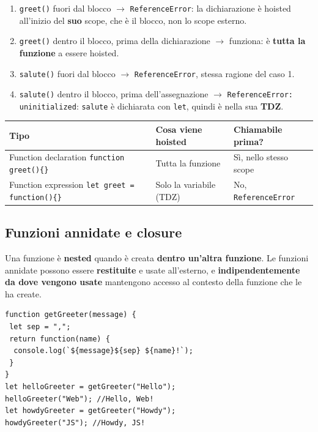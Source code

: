 \documentclass[10pt,a4paper]{article}
\begin{document}
\begin{enumerate}
  \item \texttt{greet()} fuori dal blocco $\rightarrow$ \texttt{ReferenceError}: la dichiarazione è hoisted all'inizio del \textbf{suo} scope, che è il blocco, non lo scope esterno.
  \item \texttt{greet()} dentro il blocco, prima della dichiarazione $\rightarrow$ funziona: è \textbf{tutta la funzione} a essere hoisted.
  \item \texttt{salute()} fuori dal blocco $\rightarrow$ \texttt{ReferenceError}, stessa ragione del caso 1.
  \item \texttt{salute()} dentro il blocco, prima dell'assegnazione $\rightarrow$ \texttt{ReferenceError: uninitialized}: \texttt{salute} è dichiarata con \texttt{let}, quindi è nella sua \textbf{TDZ}.
\end{enumerate}

\begin{center}
\small
\begin{tabularx}{\textwidth}{@{}lXX@{}}
\toprule
\textbf{Tipo} & \textbf{Cosa viene hoisted} & \textbf{Chiamabile prima?} \\
\midrule
Function declaration \newline \texttt{function greet()\{\}} & Tutta la funzione & Sì, nello stesso scope \\
Function expression \newline \texttt{let greet = function()\{\}} & Solo la variabile (TDZ) & No, \texttt{ReferenceError} \\
\bottomrule
\end{tabularx}
\end{center}

\subsection{Funzioni annidate e closure}

Una funzione è \textbf{nested} quando è creata \textbf{dentro un'altra funzione}. Le funzioni annidate possono essere \textbf{restituite} e usate all'esterno, e \textbf{indipendentemente da dove vengono usate} mantengono accesso al contesto della funzione che le ha create.

\begin{lstlisting}[style=js]
function getGreeter(message) {
 let sep = ",";
 return function(name) {
  console.log(`${message}${sep} ${name}!`);
 }
}
let helloGreeter = getGreeter("Hello");
helloGreeter("Web"); //Hello, Web!
let howdyGreeter = getGreeter("Howdy");
howdyGreeter("JS"); //Howdy, JS!
\end{lstlisting}
\end{document}

